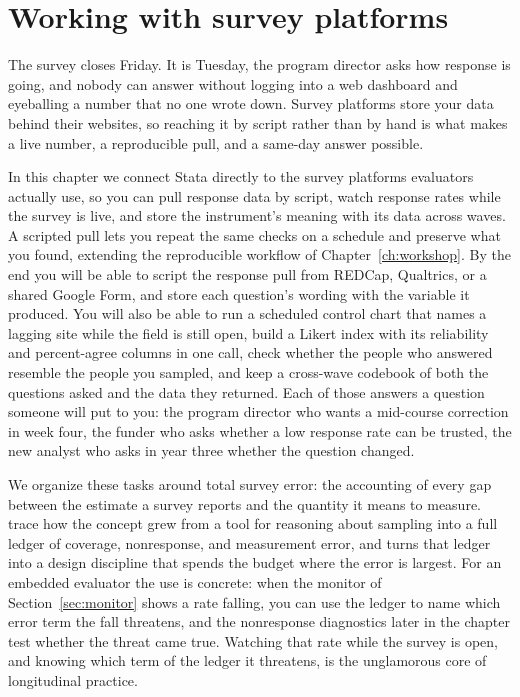 \chapter{Working with survey platforms}\label{ch:surveys}

The survey closes Friday. It is Tuesday, the program director asks how response is going, and nobody can answer without logging into a web dashboard and eyeballing a number that no one wrote down. Survey platforms store your data behind their websites, so reaching it by script rather than by hand is what makes a live number, a reproducible pull, and a same-day answer possible.

In this chapter we connect Stata directly to the survey platforms evaluators actually use, so you can pull response data by script, watch response rates while the survey is live, and store the instrument's meaning with its data across waves. A scripted pull lets you repeat the same checks on a schedule and preserve what you found, extending the reproducible workflow of Chapter~\ref{ch:workshop}. By the end you will be able to script the response pull from REDCap, Qualtrics, or a shared Google Form, and store each question's wording with the variable it produced. You will also be able to run a scheduled control chart that names a lagging site while the field is still open, build a Likert index with its reliability and percent-agree columns in one call, check whether the people who answered resemble the people you sampled, and keep a cross-wave codebook of both the questions asked and the data they returned. Each of those answers a question someone will put to you: the program director who wants a mid-course correction in week four, the funder who asks whether a low response rate can be trusted, the new analyst who asks in year three whether the question changed.

We organize these tasks around total survey error: the accounting of every gap between the estimate a survey reports and the quantity it means to measure. \textcite{groves2010tse} trace how the concept grew from a tool for reasoning about sampling into a full ledger of coverage, nonresponse, and measurement error, and \textcite{biemer2010tse} turns that ledger into a design discipline that spends the budget where the error is largest. For an embedded evaluator the use is concrete: when the monitor of Section~\ref{sec:monitor} shows a rate falling, you can use the ledger to name which error term the fall threatens, and the nonresponse diagnostics later in the chapter test whether the threat came true. Watching that rate while the survey is open, and knowing which term of the ledger it threatens, is the unglamorous core of longitudinal practice.

